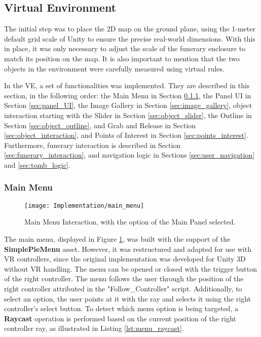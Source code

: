 \subsection{Virtual Environment}
The initial step was to place the \gls{2D} map on the ground plane, using the 1-meter default grid scale of Unity to ensure the precise real-world dimensions. With this in place, it was only necessary to adjust the scale of the funerary enclosure to match its position on the map. It is also important to mention that the two objects in the environment were carefully measured using virtual rules.

In the \gls{VE}, a set of functionalities was implemented. 
They are described in this section, in the following order: the Main Menu in Section \ref{sec:main_menu}, the Panel \gls{UI} in Section \ref{sec:panel_UI}, the Image Gallery in Section \ref{sec:image_gallery}, object interaction starting with the Slider in Section \ref{sec:object_slider}, the Outline in Section \ref{sec:object_outline}, and Grab and Release in Section \ref{sec:object_interaction}, and Points of Interest in Section \ref{sec:points_interest}. 
Furthermore, funerary interaction is described in Section \ref{sec:funerary_interaction}, and navigation logic in Sections \ref{sec:user_navigation} and \ref{sec:tomb_logic}.

\subsubsection{Main Menu}
\label{sec:main_menu}

 \begin{figure}[h!]
    \centering
    \texttt{[image: Implementation/main\_menu]}
    \caption{Main Menu Interaction, with the option of the Main Panel selected.}
    \label{fig:main_menu}
\end{figure}

The main menu, displayed in Figure \ref{fig:main_menu}, was built with the support of the \textbf{SimplePieMenu} asset.
However, it was restructured and adapted for use with \gls{VR} controllers, since the original implementation was developed for Unity \gls{3D} without \gls{VR} handling.
The menu can be opened or closed with the trigger button of the right controller. The menu follows the user through the position of the right controller attributed in the "Follow\_Controller" script.
Additionally, to select an option, the user points at it with the ray and selects it using the right controller’s select button. To detect which menu option is being targeted, a \textbf{Raycast} operation is performed based on the current position of the right controller ray, as illustrated in Listing \ref{lst:menu_raycast}.

